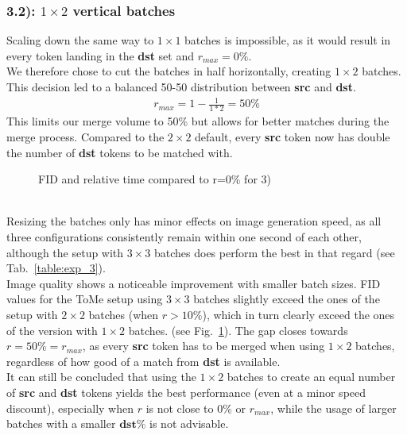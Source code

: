 \subsubsection*{3.2): $1 \times 2$ vertical batches}
Scaling down the same way to $1 \times 1$ batches is impossible, as it would result in every token landing in the \textbf{dst} set and \(r_{max}=0\%\).\\
We therefore chose to cut the batches in half horizontally, creating $1 \times 2$ batches. This decision led to a balanced 50-50 distribution between \textbf{src} and \textbf{dst}.
\begin{align*}
    r_{max} = 1-\frac{1}{1*2} = 50\%
\end{align*}
This limits our merge volume to 50\% but allows for better matches during the merge process. Compared to the $2 \times 2$ default, every \textbf{src} token now has double the number of \textbf{dst} tokens to be matched with.\\
\begin{figure}[!htb]
    
    
\caption{FID and relative time compared to r=0\% for 3)}
\label{fig:exp_3}
\end{figure}\\
Resizing the batches only has minor effects on image generation speed, as all three configurations consistently remain within one second of each other, although the setup with $3 \times 3$ batches does perform the best in that regard (see Tab.~\ref{table:exp_3}).\\
Image quality shows a noticeable improvement with smaller batch sizes. FID values for the ToMe setup using $3 \times 3$ batches slightly exceed the ones of the setup with $2 \times 2$ batches (when \(r>10\%\)), which in turn clearly exceed the ones of the version with $1 \times 2$ batches. (see Fig.~\ref{fig:exp_3}).
The gap closes towards \(r=50\%=r_{max}\), as every \textbf{src} token has to be merged when using $1 \times 2$ batches, regardless of how good of a match from \textbf{dst} is available.\\
It can still be concluded that using the $1 \times 2$ batches to create an equal number of \textbf{src} and \textbf{dst} tokens yields the best performance (even at a minor speed discount), especially when \(r\) is not close to \(0\%\) or \(r_{max}\), while the usage of larger batches with a smaller \(\textbf{dst\%}\) is not advisable.
